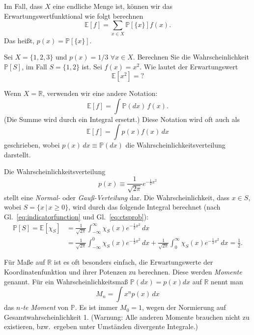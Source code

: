 Im Fall, dass $X$ eine endliche Menge ist, können wir das Erwartungswertfunktional wie folgt berechnen
\begin{equation}
	\mathbb{E}[f] = \sum_{x\in X} \mathbb{P}[\{x\}] f(x).
\end{equation} 
Das heißt, $p(x) = \mathbb{P}[\{x\}]$. 
\begin{übung}
	Sei $X = \{1,2,3\}$ und $p(x) = 1/3$ $\forall x\in X$. Berechnen Sie die Wahrscheinlichkeit $\mathbb{P}[S]$, im Fall $S=\{1,2\}$ ist. Sei $f(x) = x^2$. Wie lautet der Erwartungswert
	\begin{equation}
		\mathbb{E}[x^2] = ?
	\end{equation}
\end{übung} 

Wenn $X = \mathbb{R}$, verwenden wir eine andere Notation:
\begin{equation}
	\mathbb{E}[f] = \int \mathbb{P}(dx)\, f(x).
\end{equation}
(Die Summe wird durch ein Integral ersetzt.)
Diese Notation wird oft auch als 
\begin{equation}\label{eq:ctsprob}
	\mathbb{E}[f] = \int p(x) f(x) \, dx
\end{equation}
geschrieben, wobei $p(x)\,dx \equiv \mathbb{P}(dx)$ die Wahrscheinlichkeitsverteilung darstellt.

\begin{beispiel}
	Die Wahrscheinlichkeitsverteilung
	\begin{equation}
		p(x) \equiv \frac{1}{\sqrt{2\pi}}e^{-\frac{1}{2}x^2}
	\end{equation}
	stellt eine \emph{Normal-} oder \emph{Gauß-Verteilung} dar. Die Wahrscheinlichkeit, dass $x\in S$, wobei $S= \{x\,|\, x\ge 0\}$, wird durch das folgende Integral berechnet (nach Gl.~\ref{eq:indicatorfunction} und Gl.~\ref{eq:ctsprob}):
	\begin{equation}
		\begin{split}
			\mathbb{P}[S] = \mathbb{E}[\chi_S] &= \frac{1}{\sqrt{2\pi}}\int_{-\infty}^\infty \chi_S(x) e^{-\frac{1}{2}x^2}\, dx \\ &= \frac{1}{\sqrt{2\pi}}\int_{-\infty}^0 \chi_S(x) e^{-\frac{1}{2}x^2}\, dx + \frac{1}{\sqrt{2\pi}}\int_{0}^\infty \chi_S(x) e^{-\frac{1}{2}x^2}\, dx = \frac{1}{2}.
		\end{split}
	\end{equation}
\end{beispiel}

Für Maße auf $\mathbb{R}$ ist es oft besonders einfach, die Erwartungswerte der Koordinatenfunktion und ihrer Potenzen zu berechnen. Diese werden \emph{Momente} genannt. Für ein Wahrscheinlichkeitsmaß $\mathbb{P}(dx) = p(x)dx$ auf $\mathbb{R}$ nennt man
\begin{equation}
	M_n = \int x^n p(x)\, dx 
\end{equation}
das \emph{$n$-te Moment} von $\mathbb{P}$. Es ist immer $M_0 = 1$, wegen der Normierung auf Gesamtwahrscheinlichkeit 1. (Warnung: Alle anderen Momente brauchen nicht zu existieren, bzw.\ ergeben unter Umständen divergente Integrale.) 

